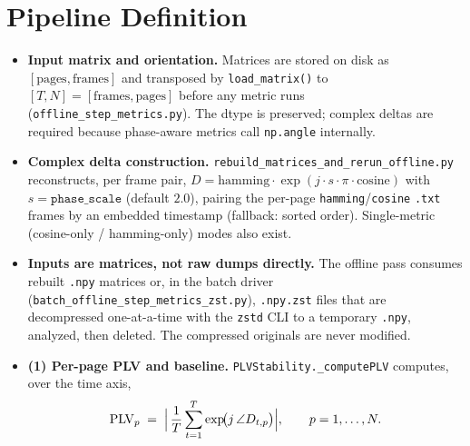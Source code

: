 \documentclass[conference]{IEEEtran}
\begin{document}
\section{Pipeline Definition}
\label{sec:pipeline}
\begin{itemize}
  \item \textbf{Input matrix and orientation.} Matrices are stored on disk as
        $[\text{pages}, \text{frames}]$ and transposed by
        \texttt{load\_matrix()} to $[T, N] = [\text{frames}, \text{pages}]$
        before any metric runs (\texttt{offline\_step\_metrics.py}). The dtype
        is preserved; complex deltas are required because phase-aware metrics
        call \texttt{np.angle} internally.
  \item \textbf{Complex delta construction.}
        \texttt{rebuild\_matrices\_and\_rerun\_offline.py} reconstructs, per
        frame pair, $D = \mathrm{hamming}\cdot\exp(j\cdot s\cdot\pi\cdot\mathrm{cosine})$
        with $s=\texttt{phase\_scale}$ (default $2.0$), pairing the per-page
        \texttt{hamming}/\texttt{cosine} \texttt{.txt} frames by an embedded
        timestamp (fallback: sorted order). Single-metric (cosine-only /
        hamming-only) modes also exist.
  \item \textbf{Inputs are matrices, not raw dumps directly.} The offline pass
        consumes rebuilt \texttt{.npy} matrices or, in the batch driver
        (\texttt{batch\_offline\_step\_metrics\_zst.py}), \texttt{.npy.zst}
        files that are decompressed one-at-a-time with the \texttt{zstd} CLI to
        a temporary \texttt{.npy}, analyzed, then deleted. The compressed
        originals are never modified.
  \item \textbf{(1) Per-page PLV and baseline.}
        \texttt{PLVStability.\_computePLV} computes, over the time axis,
        \[
          \mathrm{PLV}_p \;=\; \Bigl|\,\frac{1}{T}\sum_{t=1}^{T}
          \exp\!\bigl(j\,\angle D_{t,p}\bigr)\Bigr|,
          \qquad p = 1,\dots,N .
        \]

\end{itemize}
\end{document}
